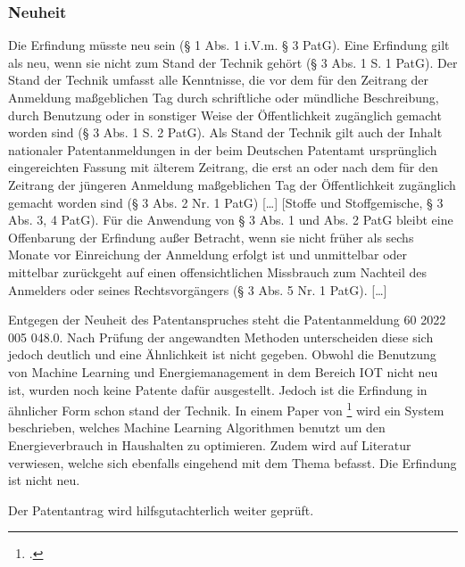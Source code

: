 \subsubsection{Neuheit}
Die Erfindung müsste neu sein (§ 1 Abs. 1 i.V.m. § 3 PatG).
Eine Erfindung gilt als neu, wenn sie nicht zum Stand der Technik gehört (§ 3 Abs. 1 S. 1 PatG). Der
Stand der Technik umfasst alle Kenntnisse, die vor dem für den Zeitrang der Anmeldung
maßgeblichen Tag durch schriftliche oder mündliche Beschreibung, durch Benutzung oder in
sonstiger Weise der Öffentlichkeit zugänglich gemacht worden sind (§ 3 Abs. 1 S. 2 PatG).
Als Stand der Technik gilt auch der Inhalt nationaler Patentanmeldungen in der beim Deutschen
Patentamt ursprünglich eingereichten Fassung mit älterem Zeitrang, die erst an oder nach dem für
den Zeitrang der jüngeren Anmeldung maßgeblichen Tag der Öffentlichkeit zugänglich gemacht
worden sind (§ 3 Abs. 2 Nr. 1 PatG) […] [Stoffe und Stoffgemische, § 3 Abs. 3, 4 PatG).
Für die Anwendung von § 3 Abs. 1 und Abs. 2 PatG bleibt eine Offenbarung der Erfindung außer
Betracht, wenn sie nicht früher als sechs Monate vor Einreichung der Anmeldung erfolgt ist und
unmittelbar oder mittelbar zurückgeht auf einen offensichtlichen Missbrauch zum Nachteil des
Anmelders oder seines Rechtsvorgängers (§ 3 Abs. 5 Nr. 1 PatG). […]

Entgegen der Neuheit des Patentanspruches steht die Patentanmeldung 60 2022 005 048.0.
Nach Prüfung der angewandten Methoden unterscheiden diese sich jedoch deutlich und eine Ähnlichkeit
ist nicht gegeben. Obwohl die Benutzung von Machine Learning und Energiemanagement
in dem Bereich IOT nicht neu ist, wurden noch keine Patente dafür ausgestellt.
Jedoch ist die Erfindung in ähnlicher Form schon stand der Technik.
In einem Paper von \footcite{energymanagement} wird ein System    
beschrieben, welches Machine Learning Algorithmen benutzt um den Energieverbrauch
in Haushalten zu optimieren. Zudem wird auf Literatur verwiesen, 
welche sich ebenfalls eingehend mit dem Thema befasst.
Die Erfindung ist nicht neu. 

Der Patentantrag wird hilfsgutachterlich weiter geprüft.




